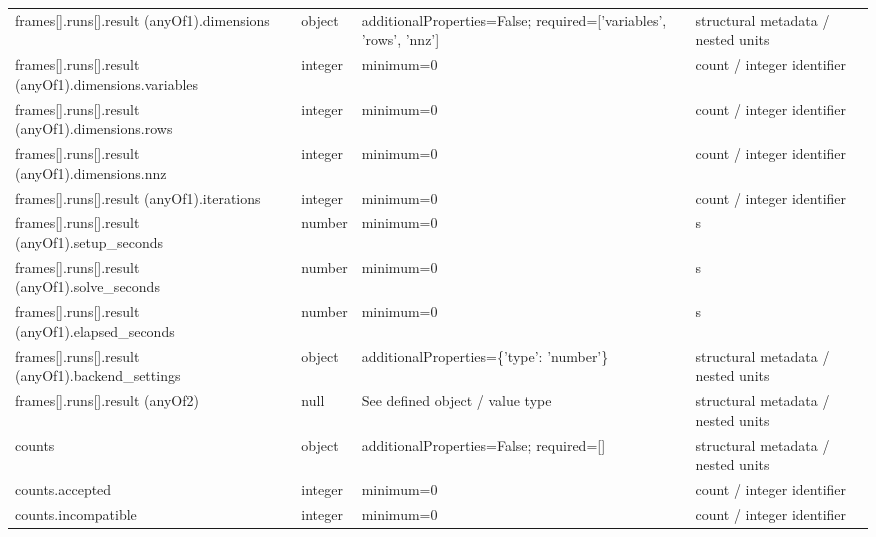 \begin{longtable}{@{}>{\raggedright\arraybackslash}p{}>{\raggedright\arraybackslash}p{}>{\raggedright\arraybackslash}p{}>{\raggedright\arraybackslash}p{}@{}}
frames[].\allowbreak{}runs[].\allowbreak{}result (anyOf1).\allowbreak{}dimensions & object & additionalProperties=\allowbreak{}False; required=\allowbreak{}['variables', 'rows', 'nnz'] & structural metadata /\allowbreak{} nested units\\
frames[].\allowbreak{}runs[].\allowbreak{}result (anyOf1).\allowbreak{}dimensions.\allowbreak{}variables & integer & minimum=\allowbreak{}0 & count /\allowbreak{} integer identifier\\
frames[].\allowbreak{}runs[].\allowbreak{}result (anyOf1).\allowbreak{}dimensions.\allowbreak{}rows & integer & minimum=\allowbreak{}0 & count /\allowbreak{} integer identifier\\
frames[].\allowbreak{}runs[].\allowbreak{}result (anyOf1).\allowbreak{}dimensions.\allowbreak{}nnz & integer & minimum=\allowbreak{}0 & count /\allowbreak{} integer identifier\\
frames[].\allowbreak{}runs[].\allowbreak{}result (anyOf1).\allowbreak{}iterations & integer & minimum=\allowbreak{}0 & count /\allowbreak{} integer identifier\\
frames[].\allowbreak{}runs[].\allowbreak{}result (anyOf1).\allowbreak{}setup\_\allowbreak{}seconds & number & minimum=\allowbreak{}0 & s\\
frames[].\allowbreak{}runs[].\allowbreak{}result (anyOf1).\allowbreak{}solve\_\allowbreak{}seconds & number & minimum=\allowbreak{}0 & s\\
frames[].\allowbreak{}runs[].\allowbreak{}result (anyOf1).\allowbreak{}elapsed\_\allowbreak{}seconds & number & minimum=\allowbreak{}0 & s\\
frames[].\allowbreak{}runs[].\allowbreak{}result (anyOf1).\allowbreak{}backend\_\allowbreak{}settings & object & additionalProperties=\allowbreak{}\{'type': 'number'\} & structural metadata /\allowbreak{} nested units\\
frames[].\allowbreak{}runs[].\allowbreak{}result (anyOf2) & null & See defined object /\allowbreak{} value type & structural metadata /\allowbreak{} nested units\\
counts & object & additionalProperties=\allowbreak{}False; required=\allowbreak{}[] & structural metadata /\allowbreak{} nested units\\
counts.\allowbreak{}accepted & integer & minimum=\allowbreak{}0 & count /\allowbreak{} integer identifier\\
counts.\allowbreak{}incompatible & integer & minimum=\allowbreak{}0 & count /\allowbreak{} integer identifier\\

\end{longtable}
